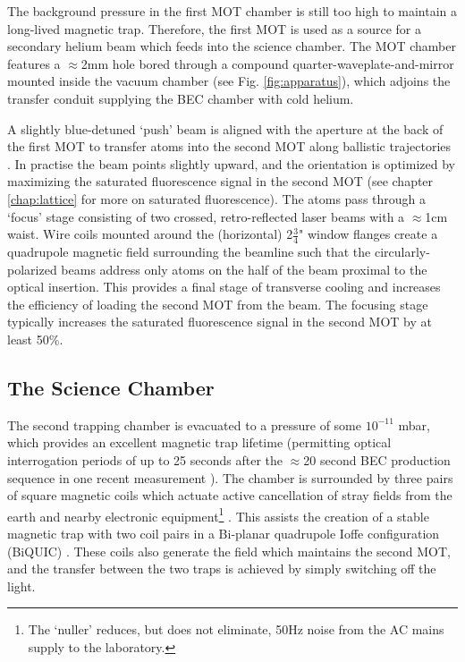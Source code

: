 	The background pressure in the first MOT chamber is still too high to maintain a long-lived magnetic trap.
	Therefore, the first MOT is used as a source for a secondary helium beam which feeds into the science chamber.
	The MOT chamber features a $\approx$2mm hole bored through a compound quarter-waveplate-and-mirror mounted inside the vacuum chamber (see Fig. \ref{fig:apparatus}), which adjoins the transfer conduit supplying the BEC chamber with cold helium.

	A slightly blue-detuned `push' beam is aligned with the aperture at the back of the first MOT to transfer atoms into the second MOT along ballistic trajectories \cite{Swansson04}.
	In practise the beam points slightly upward, and the orientation is optimized by maximizing the saturated fluorescence signal in the second MOT (see chapter \ref{chap:lattice} for more on saturated fluorescence).
	The atoms pass through a `focus' stage consisting of two crossed, retro-reflected laser beams with a $\approx$1cm waist.
	Wire coils mounted around the (horizontal) 2$\frac{3}{4}$" window flanges create a quadrupole magnetic field surrounding the beamline such that the circularly-polarized beams address only atoms on the half of the beam proximal to the optical insertion.
	This provides a final stage of transverse cooling and increases the efficiency of loading the second MOT from the \mhe beam.
	The focusing stage typically increases the saturated fluorescence signal in the second MOT by at least 50\%.
	

\subsection*{The Science Chamber}

	The second trapping chamber is evacuated to a pressure of some $10^{-11}$ mbar, which provides an excellent magnetic trap lifetime (permitting optical interrogation periods of up to 25 seconds after the $\approx$20 second BEC production sequence in one recent measurement \cite{Thomas20}).
	The chamber is surrounded by three pairs of square magnetic coils which actuate active cancellation of stray fields from the earth and nearby electronic equipment\footnote{The `nuller' reduces, but does not eliminate, 50Hz noise from the AC mains supply to the laboratory.} \cite{Dedman07}.
	This assists the creation of a stable magnetic trap with two coil pairs in a Bi-planar quadrupole Ioffe configuration (BiQUIC) \cite{Dall07}.
	These coils also generate the field which maintains the second MOT, and the transfer between the two traps is achieved by simply switching off the light.


